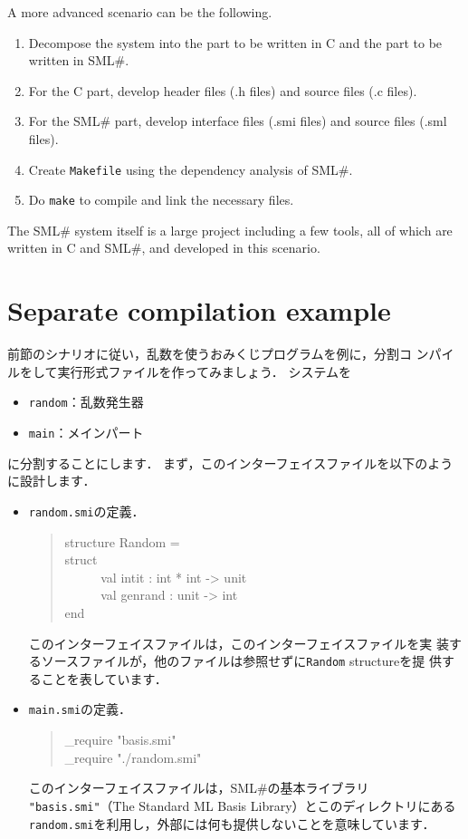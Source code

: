 \documentclass{jbook}
\newcommand{\txt}[2]{#2}
\newcommand{\smlsharp}{SML\#}
\newenvironment{program}{\begin{tt}\begin{quote}}{\end{quote}\end{tt}}
\newcommand{\myem}{\ \ \ \ \  }
\begin{document}
	A more advanced scenario can be the following.
\begin{enumerate}
\item Decompose the system into the part to be written in C and the part
to be written in \smlsharp{}.
\item For the C part, develop header files (.h files) and source files
(.c files). 
\item For the \smlsharp{} part, develop interface files (.smi files)
and source files (.sml files).
\item Create {\tt Makefile} using the dependency analysis of \smlsharp{}.
\item Do {\tt make} to compile and link the necessary files.
\end{enumerate}
	The \smlsharp{} system itself is a large project including a few
tools, all of which are written in C and \smlsharp{}, and developed in
this scenario.
\fi%

\section{\txt{分割コンパイル例}{Separate compilation example}}
\label{sec:tutorialSeparateCompilationExample}

\ifx\jp%
	前節のシナリオに従い，乱数を使うおみくじプログラムを例に，分割コ
ンパイルをして実行形式ファイルを作ってみましょう．
	システムを
\begin{itemize}
\item {\tt random}：乱数発生器
\item {\tt main}：メインパート
\end{itemize}
に分割することにします．
	まず，このインターフェイスファイルを以下のように設計します．
\begin{itemize}
\item {\tt random.smi}の定義．
\begin{program}
structure Random =
\\
struct
\\\myem
  val intit : int * int -> unit
\\\myem
  val genrand : unit -> int
\\
end
\end{program}
	このインターフェイスファイルは，このインターフェイスファイルを実
装するソースファイルが，他のファイルは参照せずに{\tt Random} structureを提
供することを表しています．
\item {\tt main.smi}の定義．
\begin{program}
\_require "basis.smi"\\
\_require "./random.smi"
\end{program}
	このインターフェイスファイルは，\smlsharp{}の基本ライブラリ{\tt
"basis.smi"}（The Standard ML Basis Library）とこのディレクトリにある
{\tt random.smi}を利用し，外部には何も提供しないことを意味しています．
\end{itemize}
\end{document}
